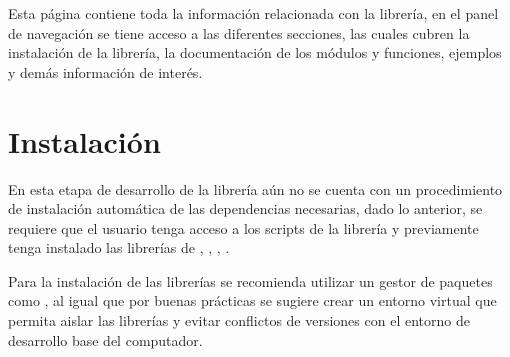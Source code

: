 \documentclass[letterpaper,10pt,openany,spanish]{sphinxmanual}
\begin{document}
Esta página contiene toda la información relacionada con la librería, en el panel de navegación se tiene acceso a las diferentes secciones, las cuales cubren la instalación de la librería, la documentación de los módulos y funciones, ejemplos y demás información de interés.


\chapter{Instalación}
\label{\detokenize{instalacion:instalacion}}\label{\detokenize{instalacion:id1}}\label{\detokenize{instalacion::doc}}
En esta etapa de desarrollo de la librería aún no se cuenta con un procedimiento de instalación automática de las dependencias necesarias, dado lo anterior, se requiere que el usuario tenga acceso a los scripts de la librería y previamente tenga instalado las librerías de , , , .

Para la instalación de las librerías se recomienda utilizar un gestor de paquetes como , al igual que por buenas prácticas se sugiere crear un entorno virtual que permita aislar las librerías y evitar conflictos de versiones con el entorno de desarrollo base del computador.
\end{document}
